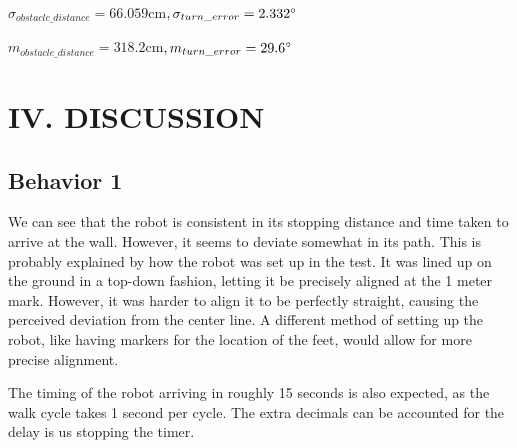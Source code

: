 \documentclass[11pt]{article}
\begin{document}
$\sigma_{obstacle\_distance} = 66.059 $cm$, \sigma_{turn\_error} =  2.332 \degree$

$m_{obstacle\_distance} = 318.2 $cm$, m_{turn\_error} =  29.6 \degree$

\section*{IV. DISCUSSION}

\subsection*{Behavior 1}

We can see that the robot is consistent in its stopping distance and time taken to arrive at the wall. However, it seems to deviate somewhat in its path. This is probably explained by how the robot was set up in the test. It was lined up on the ground in a top-down fashion, letting it be precisely aligned at the 1 meter mark. However, it was harder to align it to be perfectly straight, causing the perceived deviation from the center line. A different method of setting up the robot, like having markers for the location of the feet, would allow for more precise alignment.

The timing of the robot arriving in roughly 15 seconds is also expected, as the walk cycle takes 1 second per cycle. The extra decimals can be accounted for the delay is us stopping the timer.
\end{document}
